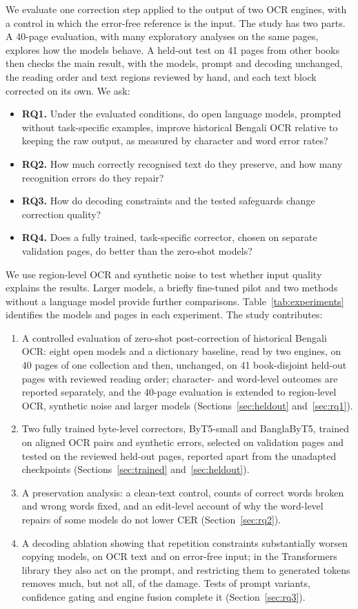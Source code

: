 \documentclass[conference]{IEEEtran}
\begin{document}
We evaluate one correction step applied to the output of two OCR engines, with a control in which the error-free reference is the input. The study has two parts. A 40-page evaluation, with many exploratory analyses on the same pages, explores how the models behave. A held-out test on 41 pages from other books then checks the main result, with the models, prompt and decoding unchanged, the reading order and text regions reviewed by hand, and each text block corrected on its own. We ask:
\begin{itemize}
\item \textbf{RQ1.} Under the evaluated conditions, do open language models, prompted without task-specific examples, improve historical Bengali OCR relative to keeping the raw output, as measured by character and word error rates?
\item \textbf{RQ2.} How much correctly recognised text do they preserve, and how many recognition errors do they repair?
\item \textbf{RQ3.} How do decoding constraints and the tested safeguards change correction quality?
\item \textbf{RQ4.} Does a fully trained, task-specific corrector, chosen on separate validation pages, do better than the zero-shot models?
\end{itemize}
We use region-level OCR and synthetic noise to test whether input quality explains the results. Larger models, a briefly fine-tuned pilot and two methods without a language model provide further comparisons. Table~\ref{tab:experiments} identifies the models and pages in each experiment. The study contributes:
\begin{enumerate}
\item A controlled evaluation of zero-shot post-correction of historical Bengali OCR: eight open models and a dictionary baseline, read by two engines, on 40 pages of one collection and then, unchanged, on 41 book-disjoint held-out pages with reviewed reading order; character- and word-level outcomes are reported separately, and the 40-page evaluation is extended to region-level OCR, synthetic noise and larger models (Sections~\ref{sec:heldout} and~\ref{sec:rq1}).
\item Two fully trained byte-level correctors, ByT5-small and BanglaByT5, trained on aligned OCR pairs and synthetic errors, selected on validation pages and tested on the reviewed held-out pages, reported apart from the unadapted checkpoints (Sections~\ref{sec:trained} and~\ref{sec:heldout}).
\item A preservation analysis: a clean-text control, counts of correct words broken and wrong words fixed, and an edit-level account of why the word-level repairs of some models do not lower CER (Section~\ref{sec:rq2}).
\item A decoding ablation showing that repetition constraints substantially worsen copying models, on OCR text and on error-free input; in the Transformers library they also act on the prompt, and restricting them to generated tokens removes much, but not all, of the damage. Tests of prompt variants, confidence gating and engine fusion complete it (Section~\ref{sec:rq3}).
\end{enumerate}
\end{document}
